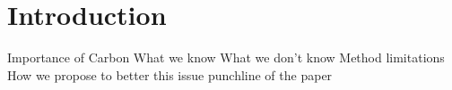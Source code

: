 \section{Introduction} 
Importance of Carbon 
What we know 
What we don't know
Method limitations
How we propose to better this issue
punchline of the paper 